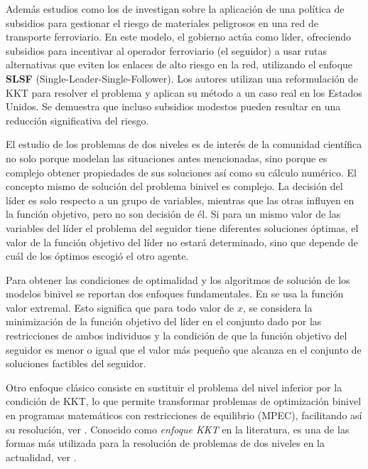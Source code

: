 Además estudios como los de \cite{Bhavsar2021ASP} investigan sobre la aplicación de una política de subsidios para gestionar el riesgo de materiales peligrosos en una red de transporte ferroviario. En este modelo, el gobierno actúa como líder, ofreciendo subsidios para incentivar al operador ferroviario (el seguidor) a usar rutas alternativas que eviten los enlaces de alto riesgo en la red, utilizando el enfoque \textbf{SLSF} (Single-Leader-Single-Follower). Los autores utilizan una reformulación de KKT para resolver el problema y aplican su método a un caso real en los Estados Unidos. Se demuestra que incluso subsidios modestos pueden resultar en una reducción significativa del riesgo.


El estudio de los problemas de dos niveles es de interés de la comunidad científica no solo porque modelan las situaciones antes mencionadas, sino porque es complejo obtener propiedades de sus soluciones así como su cálculo numérico.
El concepto mismo de solución del problema binivel es complejo. La decisión del líder es solo respecto a un grupo de variables, mientras que las otras influyen en la función objetivo, pero no son decisión de él. Si para un mismo valor de las variables del líder el problema del seguidor tiene diferentes soluciones óptimas, el valor de la función objetivo del líder no estará determinado, sino que depende de cuál de los óptimos escogió el otro agente. 

Para obtener las condiciones de optimalidad y los algoritmos de solución de los modelos binivel se reportan dos enfoques fundamentales. En \cite{DempeyZemkoho2020} se usa la función valor extremal. 
Esto significa que para todo valor de $x$, se considera la minimización de la función objetivo del líder en el conjunto dado por las restricciones de ambos individuos y la condición de que la función objetivo del seguidor es menor o igual que el valor más pequeño que alcanza en el conjunto de soluciones factibles del seguidor.
 
Otro enfoque clásico consiste en sustituir el problema del nivel inferior por la condición de KKT, lo que permite transformar problemas de optimización binivel en programas matemáticos con restricciones de equilibrio (MPEC), facilitando así su resolución, ver \cite{AnnotatedBibliographyDempe,Caselli2024BilevelOW,DempeyZemkoho2020}.
Conocido como \textit{enfoque KKT} en la literatura, es una de las formas más utilizada para la resolución de problemas de dos niveles en la actualidad, ver \cite{Aussel2021GenericityAO}.


